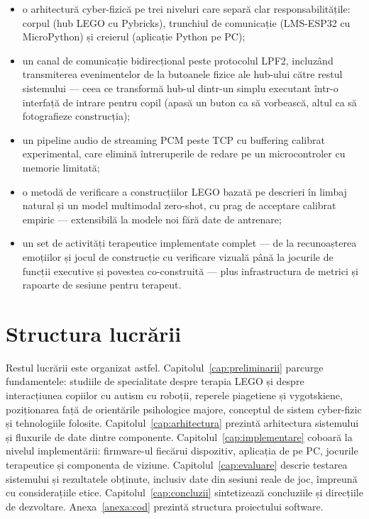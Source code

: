 \begin{itemize}
    \item o arhitectură cyber-fizică pe trei niveluri care separă clar responsabilitățile: corpul (hub LEGO cu Pybricks), trunchiul de comunicație (LMS-ESP32 cu MicroPython) și creierul (aplicație Python pe PC);
    \item un canal de comunicație bidirecțional peste protocolul LPF2, incluzând transmiterea evenimentelor de la butoanele fizice ale hub-ului către restul sistemului — ceea ce transformă hub-ul dintr-un simplu executant într-o interfață de intrare pentru copil (apasă un buton ca să vorbească, altul ca să fotografieze construcția);
    \item un pipeline audio de streaming PCM peste TCP cu buffering calibrat experimental, care elimină întreruperile de redare pe un microcontroler cu memorie limitată;
    \item o metodă de verificare a construcțiilor LEGO bazată pe descrieri în limbaj natural și un model multimodal zero-shot, cu prag de acceptare calibrat empiric — extensibilă la modele noi fără date de antrenare;
    \item un set de activități terapeutice implementate complet — de la recunoașterea emoțiilor și jocul de construcție cu verificare vizuală până la jocurile de funcții executive și povestea co-construită — plus infrastructura de metrici și rapoarte de sesiune pentru terapeut.
\end{itemize}

\section{Structura lucrării}

Restul lucrării este organizat astfel. Capitolul~\ref{cap:preliminarii} parcurge fundamentele: studiile de specialitate despre terapia LEGO și despre interacțiunea copiilor cu autism cu roboții, reperele piagetiene și vygotskiene, poziționarea față de orientările psihologice majore, conceptul de sistem cyber-fizic și tehnologiile folosite. Capitolul~\ref{cap:arhitectura} prezintă arhitectura sistemului și fluxurile de date dintre componente. Capitolul~\ref{cap:implementare} coboară la nivelul implementării: firmware-ul fiecărui dispozitiv, aplicația de pe PC, jocurile terapeutice și componenta de viziune. Capitolul~\ref{cap:evaluare} descrie testarea sistemului și rezultatele obținute, inclusiv date din sesiuni reale de joc, împreună cu considerațiile etice. Capitolul~\ref{cap:concluzii} sintetizează concluziile și direcțiile de dezvoltare. Anexa~\ref{anexa:cod} prezintă structura proiectului software.
